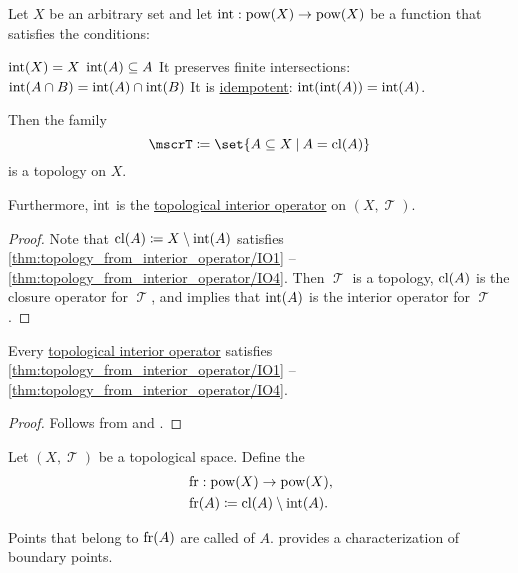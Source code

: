 \begin{proposition}\label{thm:topology_from_interior_operator}
  Let \( X \) be an arbitrary set and let \( \operatorname{int}: \operatorname{pow}(X) \to \operatorname{pow}(X) \) be a function that satisfies the conditions:
  \begin{thmenum}
     \( \operatorname{int}(X) = X \)
     \( \operatorname{int}(A) \subseteq A \)
     It preserves finite intersections: \( \operatorname{int}(A \cap B) = \operatorname{int}(A) \cap \operatorname{int}(B) \)
     It is \hyperref[def:magma/idempotent]{idempotent}: \( \operatorname{int}(\operatorname{int}(A)) = \operatorname{int}(A) \).
  \end{thmenum}

  Then the family
  \begin{equation*}
    \mscrT \coloneqq \set{ A \subseteq X \given A = \cl(A) }
  \end{equation*}
  is a topology on \( X \).

  Furthermore, \( \operatorname{int} \) is the \hyperref[def:topological_interior_operator]{topological interior operator} on \( (X, \mscrT) \).
\end{proposition}
\begin{proof}
  Note that \( \operatorname{cl}(A) \coloneqq X \setminus \operatorname{int}(A) \) satisfies \ref{thm:topology_from_interior_operator/IO1} -- \ref{thm:topology_from_interior_operator/IO4}. Then \( \mscrT \) is a topology, \( \operatorname{cl}(A) \) is the closure operator for \( \mscrT \), and  implies that \( \operatorname{int}(A) \) is the interior operator for \( \mscrT \).
\end{proof}

\begin{proposition}\label{thm:topological_interior_operator_can_generate_topology}
  Every \hyperref[def:topological_interior_operator]{topological interior operator} satisfies \ref{thm:topology_from_interior_operator/IO1} -- \ref{thm:topology_from_interior_operator/IO4}.
\end{proposition}
\begin{proof}
  Follows from  and .
\end{proof}

\begin{definition}\label{def:topological_boundary_operator}
  Let \( (X, \mscrT) \) be a topological space. Define the 
  \begin{equation*}
    \begin{aligned}
      &\operatorname{fr}: \operatorname{pow}(X) \to \operatorname{pow}(X), \\
      &\operatorname{fr}(A) \coloneqq \operatorname{cl}(A) \setminus \operatorname{int}(A).
    \end{aligned}
  \end{equation*}

  Points that belong to \( \operatorname{fr}(A) \) are called  of \( A \).  provides a characterization of boundary points.
\end{definition}

